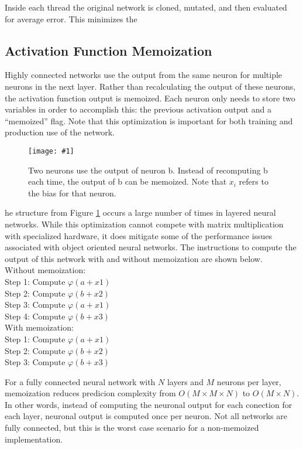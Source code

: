 \documentclass[twocolumn]{article}
\newcommand\fig[5]{
	\begin{figure}[H]
		\begin{center}\texttt{[image: \#1]}\end{center}
		\caption{#4}\label{fig:#2}
	\end{figure}
}
\newcommand\figRef[1]{Figure \ref{fig:#1}\xspace}
\begin{document}
Inside each thread the original network is cloned, mutated, and then evaluated for average error. This minimizes the 

\subsection{Activation Function Memoization}

Highly connected networks use the output from the same neuron for multiple neurons in the next layer. Rather than recalculating the output of these neurons, the activation function output is memoized. Each neuron only needs to store two variables in order to accomplish this: the previous activation output and a ``memoized'' flag. Note that this optimization is important for both training and production use of the network.

\fig{images/memoization.png}{memoization}{0.4}{
Two neurons use the output of neuron b. Instead of recomputing b each time, the output of b can be memoized. Note that $x_i$ refers to the bias for that neuron.
}

The structure from \figRef{memoization} occurs a large number of times in layered neural networks. While this optimization cannot compete with matrix multiplication with specialized hardware, it does mitigate some of the performance issues associated with object oriented neural networks. The instructions to compute the output of this network with and without memoization are shown below. \\

\noindent Without memoization: \\
\indent Step 1: Compute $\varphi(a+x1)$ \\
\indent Step 2: Compute $\varphi(b+x2)$ \\
\indent Step 3: Compute $\varphi(a+x1)$ \\
\indent Step 4: Compute $\varphi(b+x3)$ \\

\noindent With memoization: \\
\indent Step 1: Compute $\varphi(a+x1)$ \\
\indent Step 2: Compute $\varphi(b+x2)$ \\
\indent Step 3: Compute $\varphi(b+x3)$

For a fully connected neural network with $N$ layers and $M$ neurons per layer, memoization reduces predicion complexity from $O(M \times M \times N)$ to $O(M \times N)$. In other words, instead of computing the neuronal output for each conection for each layer, neuronal output is computed once per neuron. Not all networks are fully connected, but this is the worst case scenario for a non-memoized implementation. 
\end{document}
